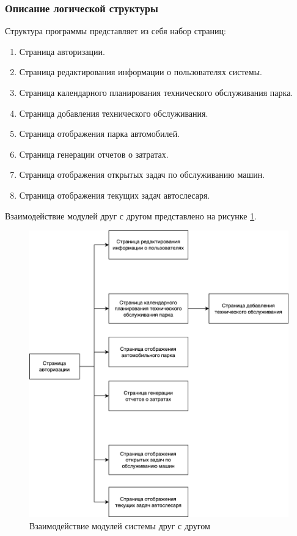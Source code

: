 \documentclass[../nirs.tex]{subfiles}
\begin{document}
    \subsubsection*{Описание логической структуры}

    Структура программы представляет из себя набор страниц:

    \begin{enumerate}
        \item Страница авторизации.
        \item Страница редактирования информации о пользователях системы.
        \item Страница календарного планирования технического обслуживания парка.
        \item Страница добавления технического обслуживания.
        \item Страница отображения парка автомобилей.
        \item Страница генерации отчетов о затратах.
        \item Страница отображения открытых задач по обслуживанию машин.
        \item Страница отображения текущих задач автослесаря.
    \end{enumerate}

    Взаимодействие модулей друг с другом представлено на рисунке \ref{fig:pages}.

    \begin{figure}
        \centering
        \includegraphics[width=\textwidth]{images/pages.png}
        \caption{Взаимодействие модулей системы друг с другом}
        \label{fig:pages}
    \end{figure}
\end{document}
